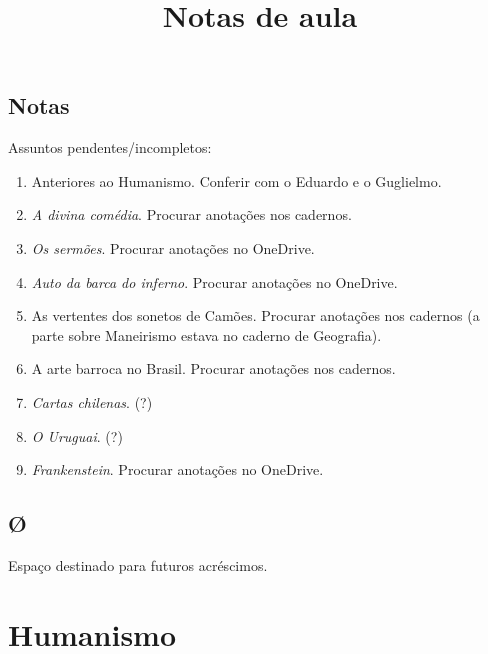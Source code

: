 \documentclass[12pt]{book}
\title{Notas de aula}
\begin{document}
	
	\setcounter{chapter}{-1}
	
	\maketitle
	
	\frontmatter
	\chapter{Notas}
	\par Assuntos pendentes/incompletos:
	\begin{enumerate}
		\item Anteriores ao Humanismo. Conferir com o Eduardo e o Guglielmo.
		\item \textit{A divina comédia}. Procurar anotações nos cadernos.
		\item \textit{Os sermões}. Procurar anotações no OneDrive.
		\item \textit{Auto da barca do inferno}. Procurar anotações no OneDrive.
		\item As vertentes dos sonetos de Camões. Procurar anotações nos cadernos (a parte sobre Maneirismo estava no caderno de Geografia).
		\item A arte barroca no Brasil. Procurar anotações nos cadernos.
		\item \textit{Cartas chilenas}. (?)
		\item \textit{O Uruguai}. (?)
		\item \textit{Frankenstein}. Procurar anotações no OneDrive.
	\end{enumerate}
	
	\listoffigures
	\tableofcontents
	
	\mainmatter
	\chapter{\O}
	Espaço destinado para futuros acréscimos.
	
	\part{Humanismo}
	
\end{document}
